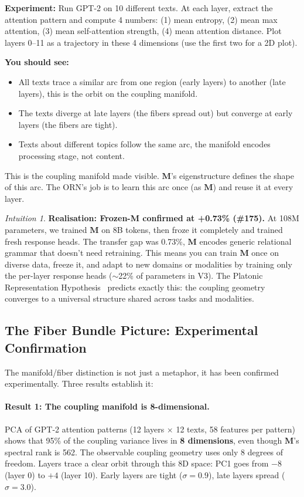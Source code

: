 \documentclass[11pt, a4paper]{article}
\newcommand{\M}{\mathbf{M}}
\theoremstyle{remark}
\newtheorem*{intuition}{Intuition}
\begin{document}
\textbf{Experiment:} Run GPT-2 on 10 different texts.
At each layer, extract the attention pattern and compute 4 numbers: (1) mean entropy, (2) mean max attention, (3) mean self-attention strength, (4) mean attention distance.
Plot layers 0--11 as a trajectory in these 4 dimensions (use the first two for a 2D plot).

\textbf{You should see:}
\begin{itemize}[nosep]
    \item All texts trace a similar arc from one region (early layers) to another (late layers), this is the orbit on the coupling manifold.
    \item The texts diverge at late layers (the fibers spread out) but converge at early layers (the fibers are tight).
    \item Texts about different topics follow the same arc, the manifold encodes processing stage, not content.
\end{itemize}

This is the coupling manifold made visible.
$\M$'s eigenstructure defines the shape of this arc.
The ORN's job is to learn this arc once (as $\M$) and reuse it at every layer.

\begin{intuition}
\textbf{Realisation: Frozen-M confirmed at +0.73\% (\#175).}
At 108M parameters, we trained $\M$ on 8B tokens, then froze it completely and trained fresh response heads.
The transfer gap was 0.73\%, $\M$ encodes generic relational grammar that doesn't need retraining.
This means you can train $\M$ once on diverse data, freeze it, and adapt to new domains or modalities by training only the per-layer response heads ($\sim$22\% of parameters in V3).
The Platonic Representation Hypothesis~\cite{huh2024platonic} predicts exactly this: the coupling geometry converges to a universal structure shared across tasks and modalities.
\end{intuition}

\subsection{The Fiber Bundle Picture: Experimental Confirmation}

The manifold/fiber distinction is not just a metaphor, it has been confirmed experimentally.
Three results establish it:

\paragraph{Result 1: The coupling manifold is 8-dimensional.}
PCA of GPT-2 attention patterns (12 layers $\times$ 12 texts, 58 features per pattern) shows that 95\% of the coupling variance lives in \textbf{8 dimensions}, even though $\M$'s spectral rank is 562.
The observable coupling geometry uses only 8 degrees of freedom.
Layers trace a clear orbit through this 8D space: PC1 goes from $-8$ (layer 0) to $+4$ (layer 10).
Early layers are tight ($\sigma{=}0.9$), late layers spread ($\sigma{=}3.0$).
\end{document}
